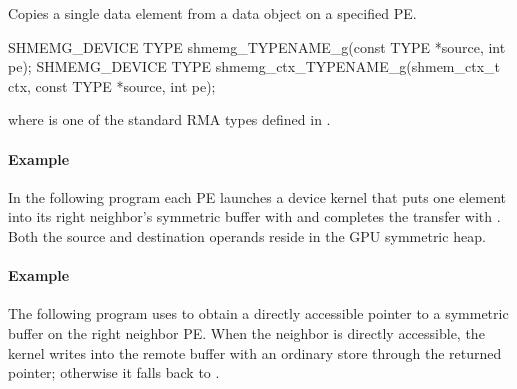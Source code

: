 Copies a single data element from a data object on a specified \ac{PE}.

\begin{apidefinition}
\begin{Csynopsis}
SHMEMG_DEVICE TYPE shmemg_TYPENAME_g(const TYPE *source, int pe);
SHMEMG_DEVICE TYPE shmemg_ctx_TYPENAME_g(shmem_ctx_t ctx,
    const TYPE *source, int pe);
\end{Csynopsis}

where \TYPE{} is one of the standard RMA types defined in .

\begin{apiarguments}
\end{apiarguments}


\end{apidefinition}

\paragraph*{\textbf{Example}}\mbox{}\par\nobreak
In the following program each \ac{PE} launches a device kernel that puts one
element into its right neighbor's symmetric buffer with 
and completes the transfer with . Both the source and
destination operands reside in the \ac{GPU} symmetric heap.


\paragraph*{\textbf{Example}}\mbox{}\par\nobreak
The following program uses  to obtain a directly accessible
pointer to a symmetric buffer on the right neighbor \ac{PE}. When the neighbor
is directly accessible, the kernel writes into the remote buffer with an
ordinary store through the returned pointer; otherwise it falls back to
.


